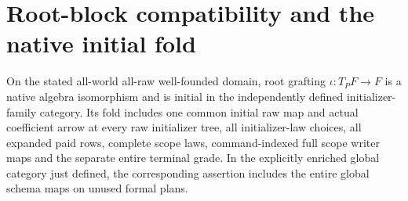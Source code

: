 \documentclass[11pt]{article}
\begin{document}
\section{Root-block compatibility and the native initial fold}
\begin{theorem}
On the stated all-world all-raw well-founded domain, root grafting $\iota:T_PF\to F$ is a native algebra isomorphism and is initial in the independently defined initializer-family category. Its fold includes one common initial raw map and actual coefficient arrow at every raw initializer tree, all initializer-law choices, all expanded paid rows, complete scope laws, command-indexed full scope writer maps and the separate entire terminal grade. In the explicitly enriched global category just defined, the corresponding assertion includes the entire global schema maps on unused formal plans.
\end{theorem}
\end{document}
